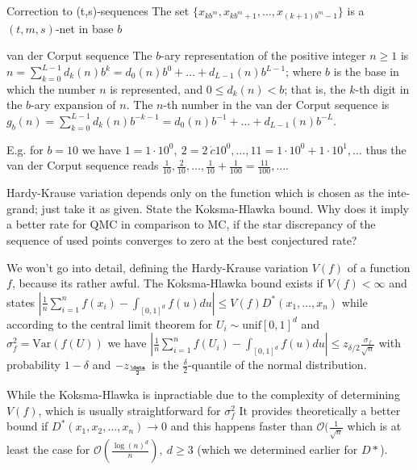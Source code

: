 Correction to (t,s)-sequences
The set \( \{x_{kb^m}, x_{kb^m + 1}, \dots, x_{(k+1)b^{m} - 1}\}\) is a \( (t, m, s) \)-net in base \( b \)

van der Corput sequence
The \(b\)-ary representation of the positive integer \(n \ge 1\) is
\( n = \sum_{k=0}^{L-1} d_k(n) b^k = d_0(n) b^0 + \dots + d_{L-1}(n) b^{L-1} \);
where \(b\) is the base in which the number \(n\) is represented, and \(0 \le d_k(n) < b\); that is, the \(k\)-th digit in the \(b\)-ary expansion of \(n\). The \(n\)-th number in the van der Corput sequence is
\( g_b(n) = \sum_{k=0}^{L-1} d_k(n) b^{-k-1} = d_0(n) b^{-1} + \dots + d_{L-1}(n) b^{-L} \).

E.g. for \( b = 10 \) we have \( 1 = 1 \cdot 10^0,\ 2 = 2 \ \dot{c} 10^{0}, \dots, 11 = 1 \cdot 10^0 + 1 \cdot 10^1, \dots \) thus
the van der Corput sequence reads
\( \frac{1}{10}, \frac{2}{10}, \dots, \frac{1}{10} + \frac{1}{100} = \frac{11}{100}, \dots \).


Hardy-Krause variation depends only on the function which is chosen as the inte-
grand; just take it as given. State the Koksma-Hlawka bound. Why does it imply
a better rate for QMC in comparison to MC, if the star discrepancy of the sequence
of used points converges to zero at the best conjectured rate?

We won't go into detail, defining the Hardy-Krause variation \( V(f) \)
of a function \( f \), because its rather awful.
The Koksma-Hlawka bound exists if \( V(f) < \infty \)
and states
\( |\frac{1}{n}\sum_{i=1}^n f(x_i) - \int_{[0, 1]^d} f(u) du| \leq V(f)D^{\ast}(x_1, \dots, x_n) \)
while according to the central limit theorem for \( U_i \sim \text{unif}[0, 1]^{d} \) and \( \sigma^{2}_f = \text{Var}(f(U)) \)
we have
\( |\frac{1}{n}\sum_{i=1}^{n} f(U_i) - \int_{[0, 1]^d} f(u)du| \leq z_{\delta/2} \frac{\sigma_f}{\sqrt{n} } \)
with probability \( 1 - \delta \) and \( -z_{\frac{\deta}{2}} \) is the \( \frac{\delta}{2} \)-quantile of the normal distribution.

While the Koksma-Hlawka is inpractiable due to the complexity of determining \( V(f) \), which is usually straightforward for \( \sigma^{2}_f \)
It provides theoretically a better bound if \( D^{\ast}(x_1, x_2, \dots, x_n) \to 0 \) and this happens faster than \( \mathcal{O}(\frac{1}{\sqrt{n}} \)
which is at least the case for \( \mathcal{O}(\frac{\log(n)^{d}}{n}), \ d \geq 3 \) (which we determined earlier for \( D* \)).

